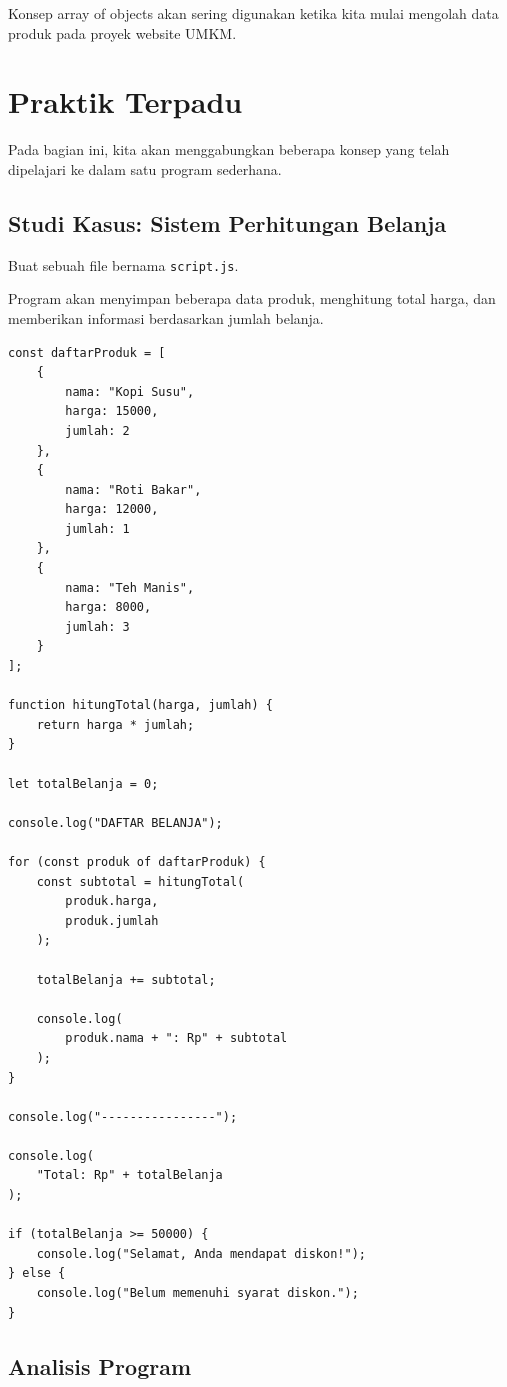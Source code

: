 \documentclass[12pt,a4paper]{article}
\begin{document}
Konsep array of objects akan sering digunakan
ketika kita mulai mengolah data produk pada
proyek website UMKM.

\section{Praktik Terpadu}

Pada bagian ini, kita akan menggabungkan beberapa
konsep yang telah dipelajari ke dalam satu program
sederhana.

\subsection{Studi Kasus: Sistem Perhitungan Belanja}

Buat sebuah file bernama \texttt{script.js}.

Program akan menyimpan beberapa data produk,
menghitung total harga, dan memberikan informasi
berdasarkan jumlah belanja.

\begin{lstlisting}
const daftarProduk = [
    {
        nama: "Kopi Susu",
        harga: 15000,
        jumlah: 2
    },
    {
        nama: "Roti Bakar",
        harga: 12000,
        jumlah: 1
    },
    {
        nama: "Teh Manis",
        harga: 8000,
        jumlah: 3
    }
];

function hitungTotal(harga, jumlah) {
    return harga * jumlah;
}

let totalBelanja = 0;

console.log("DAFTAR BELANJA");

for (const produk of daftarProduk) {
    const subtotal = hitungTotal(
        produk.harga,
        produk.jumlah
    );

    totalBelanja += subtotal;

    console.log(
        produk.nama + ": Rp" + subtotal
    );
}

console.log("----------------");

console.log(
    "Total: Rp" + totalBelanja
);

if (totalBelanja >= 50000) {
    console.log("Selamat, Anda mendapat diskon!");
} else {
    console.log("Belum memenuhi syarat diskon.");
}
\end{lstlisting}

\subsection{Analisis Program}
\end{document}
